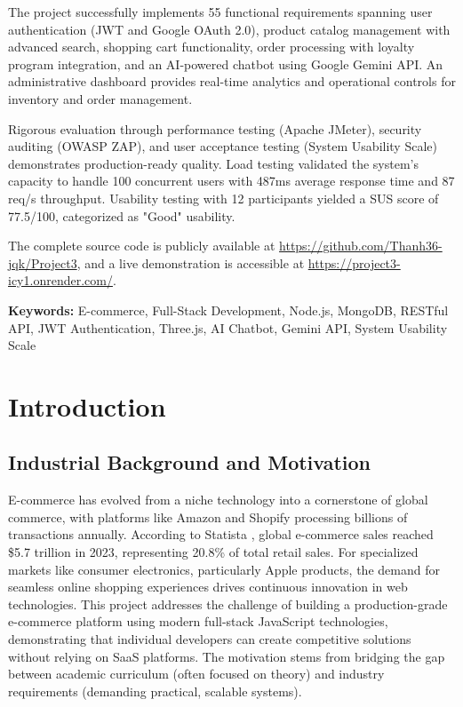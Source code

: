 \documentclass[12pt, a4paper]{report}
\begin{document}
The project successfully implements 55 functional requirements spanning user authentication (JWT and Google OAuth 2.0), product catalog management with advanced search, shopping cart functionality, order processing with loyalty program integration, and an AI-powered chatbot using Google Gemini API. An administrative dashboard provides real-time analytics and operational controls for inventory and order management.

Rigorous evaluation through performance testing (Apache JMeter), security auditing (OWASP ZAP), and user acceptance testing (System Usability Scale) demonstrates production-ready quality. Load testing validated the system's capacity to handle 100 concurrent users with 487ms average response time and 87 req/s throughput. Usability testing with 12 participants yielded a SUS score of 77.5/100, categorized as "Good" usability.

The complete source code is publicly available at \url{https://github.com/Thanh36-jqk/Project3}, and a live demonstration is accessible at \url{https://project3-icy1.onrender.com/}.

\textbf{Keywords:} E-commerce, Full-Stack Development, Node.js, MongoDB, RESTful API, JWT Authentication, Three.js, AI Chatbot, Gemini API, System Usability Scale

\tableofcontents
\newpage

\listoffigures
\newpage

\listoftables
\newpage

\setcounter{page}{1}


\chapter{Introduction}

\section{Industrial Background and Motivation}

E-commerce has evolved from a niche technology into a cornerstone of global commerce, with platforms like Amazon and Shopify processing billions of transactions annually. According to Statista \cite{statista2023}, global e-commerce sales reached \$5.7 trillion in 2023, representing 20.8\% of total retail sales. For specialized markets like consumer electronics, particularly Apple products, the demand for seamless online shopping experiences drives continuous innovation in web technologies. This project addresses the challenge of building a production-grade e-commerce platform using modern full-stack JavaScript technologies, demonstrating that individual developers can create competitive solutions without relying on SaaS platforms. The motivation stems from bridging the gap between academic curriculum (often focused on theory) and industry requirements (demanding practical, scalable systems).
\end{document}
